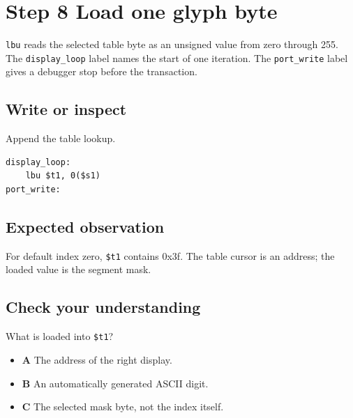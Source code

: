\section{Step 8 Load one glyph
  byte}\label{005-seven-segment-counter-s08-step-8-load-one-glyph-byte}

\texttt{lbu} reads the selected table byte as an unsigned value from
zero through 255. The \texttt{display\_loop} label names the start of
one iteration. The \texttt{port\_write} label gives a debugger stop
before the transaction.

\subsection{Write or
  inspect}\label{005-seven-segment-counter-s08-write-or-inspect}

Append the table lookup.

\begin{verbatim}
display_loop:
    lbu $t1, 0($s1)
port_write:
\end{verbatim}

\subsection{Expected
  observation}\label{005-seven-segment-counter-s08-expected-observation}

For default index zero, \texttt{\$t1} contains 0x3f. The table cursor is
an address; the loaded value is the segment mask.

\subsection{Check your
  understanding}\label{005-seven-segment-counter-s08-check-your-understanding}

What is loaded into \texttt{\$t1}?

\begin{itemize}
  \tightlist
  \item
        \textbf{A} The address of the right display.
  \item
        \textbf{B} An automatically generated ASCII digit.
  \item
        \textbf{C} The selected mask byte, not the index itself.
\end{itemize}
